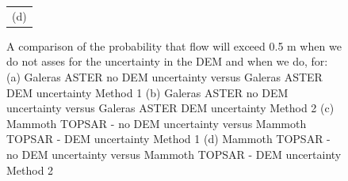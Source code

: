 \documentclass[12pt]{article}
\begin{document}
\begin{figure}[H]
\begin{minipage}{0.6\textwidth}
\begin{tabular}{c}
        (d)
        \end{tabular}
    \end{minipage} 
    \caption{A comparison of the probability that flow will exceed 0.5
      m when we do not asses for the uncertainty in the DEM and when
      we do, for: (a) Galeras ASTER no DEM uncertainty versus Galeras
      ASTER DEM uncertainty Method 1 (b) Galeras ASTER no DEM
      uncertainty versus Galeras ASTER DEM uncertainty Method 2
      (c) Mammoth TOPSAR - no DEM uncertainty versus Mammoth TOPSAR -
      DEM uncertainty Method 1 (d) Mammoth TOPSAR - no DEM uncertainty
      versus Mammoth TOPSAR - DEM uncertainty Method 2}
\label{fig9}  
\end{figure}
\end{document}
